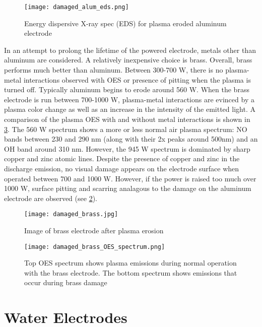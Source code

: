 \begin{figure}[htbp]
  \centering
  \texttt{[image: damaged\_alum\_eds.png]}
  \caption{Energy dispersive X-ray spec (EDS) for plasma eroded aluminum electrode}
  \label{fig:EDS_damaged_alum}
\end{figure}

In an attempt to prolong the lifetime of the powered electrode, metals other than aluminum are considered. A relatively inexpensive choice is brass. Overall, brass performs much better than aluminum. Between 300-700 W, there is no plasma-metal interactions observed with OES or presence of pitting when the plasma is turned off. Typically aluminum begins to erode around 560 W. When the brass electrode is run between 700-1000 W, plasma-metal interactions are evinced by a plasma color change as well as an increase in the intensity of the emitted light. A comparison of the plasma OES with and without metal interactions is shown in \cref{fig:OES_brass_damage}. The 560 W spectrum shows a more or less normal air plasma spectrum: NO bands between 230 and 290 nm (along with their 2x peaks around 500nm) and an OH band around 310 nm. However, the 945 W spectrum is dominated by sharp copper and zinc atomic lines. Despite the presence of copper and zinc in the discharge emission, no visual damage appears on the electrode surface when operated between 700 and 1000 W. However, if the power is raised too much over 1000 W, surface pitting and scarring analagous to the damage on the aluminum electrode are observed (see \cref{fig:brass_damage_full}).

\begin{figure}[htbp]
  \centering
  \texttt{[image: damaged\_brass.jpg]}
  \caption{Image of brass electrode after plasma erosion}
  \label{fig:brass_damage_full}
\end{figure}

\begin{figure}[htbp]
  \centering
  \texttt{[image: damaged\_brass\_OES\_spectrum.png]}
  \caption{Top OES spectrum shows plasma emissions during normal operation with the brass electrode. The bottom spectrum shows emissions that occur during brass damage}
  \label{fig:OES_brass_damage}
\end{figure}

\section{Water Electrodes}
\label{sec:water_electrodes}

